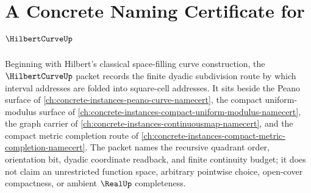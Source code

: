 \chapter{A Concrete Naming Certificate for $\HilbertCurveUp$}
\label{ch:concrete-instances-hilbert-curve-namecert}

Beginning with Hilbert's classical space-filling curve construction, the $\HilbertCurveUp$ packet records the finite dyadic subdivision route by which interval addresses are folded into square-cell addresses. It sits beside the Peano surface of \autoref{ch:concrete-instances-peano-curve-namecert}, the compact uniform-modulus surface of \autoref{ch:concrete-instances-compact-uniform-modulus-namecert}, the graph carrier of \autoref{ch:concrete-instances-continuousmap-namecert}, and the compact metric completion route of \autoref{ch:concrete-instances-compact-metric-completion-namecert}. The packet names the recursive quadrant order, orientation bit, dyadic coordinate readback, and finite continuity budget; it does not claim an unrestricted function space, arbitrary pointwise choice, open-cover compactness, or ambient $\RealUp$ completeness.


